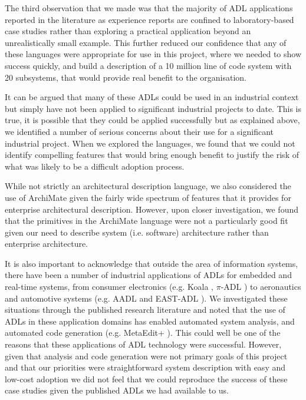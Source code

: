 The third observation that we made was that the majority of ADL applications reported in the literature as experience reports are confined to laboratory-based case studies rather than exploring a practical application beyond an unrealistically small example.  This further reduced our confidence that any of these languages were appropriate for use in this project, where we needed to show success quickly, and build a description of a 10 million line of code system with 20 subsystems, that would provide real benefit to the organisation.

It can be argued that many of these ADLs could be used in an industrial context but simply have not been applied to significant industrial projects to date.  This is true, it is possible that they could be applied successfully but as explained above, we identified a number of serious concerns about their use for a significant industrial project.  When we explored the languages, we found that we could not identify compelling features that would bring enough benefit to justify the risk of what was likely to be a difficult adoption process.

While not strictly an architectural description language, we also considered the use of ArchiMate \cite{lankhorst2009-archimate} given the fairly wide spectrum of features that it provides for enterprise architectural description. However, upon closer investigation, we found that the primitives in the ArchiMate language were not a particularly good fit given our need to describe system (i.e. software) architecture rather than enterprise architecture.

It is also important to acknowledge that outside the area of information systems, there have been a number of industrial applications of ADLs for embedded and real-time systems, from consumer electronics (e.g. Koala \cite{vanommering2000-koala}, $\pi$-ADL \cite{oquendo2004-piadl}) to aeronautics and automotive systems (e.g. AADL \cite{sae2009-aadl} and EAST-ADL \cite{cuenot2010-east}). We investigated these situations through the published research literature and noted that the use of ADLs in these application domains has enabled automated system analysis, and automated code generation (e.g. MetaEdit+ \cite{smolander1991-metaedit}). This could well be one of the reasons that these applications of ADL technology were successful.  However, given that analysis and code generation were not primary goals of this project and that our priorities were straightforward system description with easy and low-cost adoption we did not feel that we could reproduce the success of these case studies given the published ADLs we had available to us.

